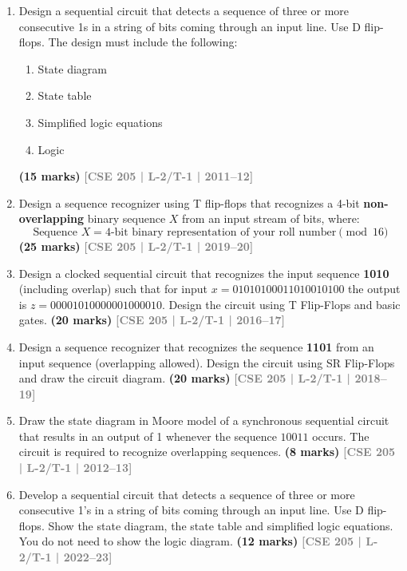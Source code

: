 \documentclass[12pt,a4paper]{article}
\newcommand{\yr}[1]{\hfill\textcolor{gray}{\small\textbf{[#1]}}}
\newcommand{\mk}[1]{\textcolor{orange!70!black}{\small\textbf{(#1 marks)}}}
\begin{document}
\begin{enumerate}

\item Design a sequential circuit that detects a sequence of three or more consecutive 1s in a string of bits coming through an input line. Use D flip-flops. The design must include the following:
\begin{enumerate}
  \item State diagram
  \item State table
  \item Simplified logic equations
  \item Logic 
  

  \end{enumerate}
\mk{15} \yr{CSE 205 | L-2/T-1 | 2011--12}
\item Design a sequence recognizer using T flip-flops that recognizes a 4-bit \textbf{non-overlapping} binary sequence $X$ from an input stream of bits, where:
\[ \text{Sequence } X = \text{4-bit binary representation of your roll number} \pmod{16} \]
\mk{25} \yr{CSE 205 | L-2/T-1 | 2019--20}



\item Design a clocked sequential circuit that recognizes the input sequence \textbf{1010} (including overlap) such that for input $x = 01010100011010010100$ the output is $z = 00001010000001000010$. Design the circuit using T Flip-Flops and basic gates.
\mk{20} \yr{CSE 205 | L-2/T-1 | 2016--17}

\item Design a sequence recognizer that recognizes the sequence \textbf{1101} from an input sequence (overlapping allowed). Design the circuit using SR Flip-Flops and draw the circuit diagram.
\mk{20} \yr{CSE 205 | L-2/T-1 | 2018--19}



\item Draw the state diagram in Moore model of a synchronous sequential circuit that results in an output of 1 whenever the sequence $10011$ occurs. The circuit is required to recognize overlapping sequences.
\mk{8} \yr{CSE 205 | L-2/T-1 | 2012--13}

\item Develop a sequential circuit that detects a sequence of three or more consecutive 1's in a string of bits coming through an input line. Use D flip-flops. Show the state diagram, the state table and simplified logic equations. You do not need to show the logic diagram.
\mk{12} \yr{CSE 205 | L-2/T-1 | 2022--23}

\end{enumerate}
\end{document}
